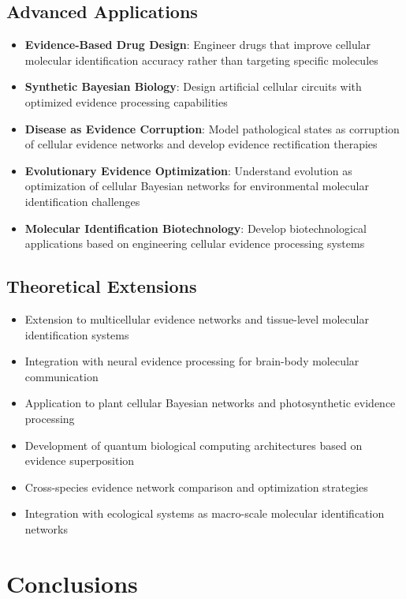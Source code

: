\documentclass[12pt,a4paper]{article}
\begin{document}
\subsection{Advanced Applications}

\begin{itemize}
\item \textbf{Evidence-Based Drug Design}: Engineer drugs that improve cellular molecular identification accuracy rather than targeting specific molecules
\item \textbf{Synthetic Bayesian Biology}: Design artificial cellular circuits with optimized evidence processing capabilities
\item \textbf{Disease as Evidence Corruption}: Model pathological states as corruption of cellular evidence networks and develop evidence rectification therapies
\item \textbf{Evolutionary Evidence Optimization}: Understand evolution as optimization of cellular Bayesian networks for environmental molecular identification challenges
\item \textbf{Molecular Identification Biotechnology}: Develop biotechnological applications based on engineering cellular evidence processing systems
\end{itemize}

\subsection{Theoretical Extensions}

\begin{itemize}
\item Extension to multicellular evidence networks and tissue-level molecular identification systems
\item Integration with neural evidence processing for brain-body molecular communication
\item Application to plant cellular Bayesian networks and photosynthetic evidence processing
\item Development of quantum biological computing architectures based on evidence superposition
\item Cross-species evidence network comparison and optimization strategies
\item Integration with ecological systems as macro-scale molecular identification networks
\end{itemize}

\section{Conclusions}
\end{document}
